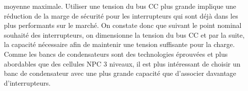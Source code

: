 moyenne maximale. Utiliser une tension du bus CC plus grande implique une réduction de la marge de sécurité pour les interrupteurs qui sont déjà dans les plus performants sur le marché. On constate donc que suivant le point nominal souhaité des interrupteurs, on dimensionne la tension du bus CC et par la suite, la capacité nécessaire afin de maintenir une tension suffisante pour la charge. Comme les bancs de condensateurs sont des technologies éprouvées et plus abordables que des cellules NPC 3 niveaux, il est plus intéressant de choisir un banc de condensateur avec une plus grande capacité que d'associer davantage d'interrupteurs.
